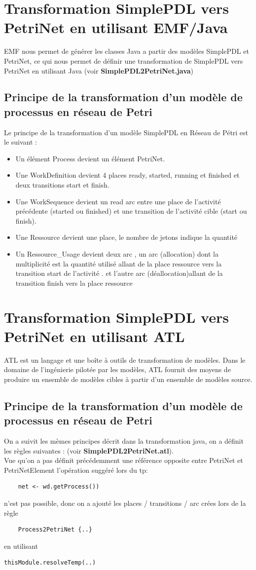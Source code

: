 \documentclass{article}
\begin{document}
\section{Transformation SimplePDL vers PetriNet en utilisant EMF/Java}
EMF nous permet de générer les classes Java a partir des modèles SimplePDL et PetriNet, ce qui nous permet de définir une transformation
de SimplePDL vers PetriNet en utilisant Java (voir \textbf{SimplePDL2PetriNet.java})
\subsection{Principe de la transformation d’un modèle de processus en réseau de Petri}
Le principe de la transformation d’un modèle SimplePDL en Réseau de Pétri est le suivant :
\begin{itemize}
    \item Un élément Process devient un élément PetriNet.
    \item Une WorkDefinition devient 4 places ready, started, running et finished et deux transitions start et finish.
    \item Une WorkSequence devient un read arc entre une place de l’activité précédente (started ou finished) et une transition de l’activité cible (start ou finish).
    \item Une Ressource devient une place, le nombre de jetons indique la quantité
    \item Un Ressource\_Usage devient deux arc , un arc (allocation) dont la multiplicité est la quantité utilisé allant de la place ressource vers la transition start de l'activité . et l'autre arc (déallocation)allant de la transition finish vers la place ressource
\end{itemize}

\section{Transformation SimplePDL vers PetriNet en utilisant ATL}
ATL est un langage et une boîte à outils de transformation de modèles. Dans le domaine de l'ingénierie pilotée par les modèles, 
ATL fournit des moyens de produire un ensemble de modèles cibles à partir d'un ensemble de modèles source.
\subsection{Principe de la transformation d’un modèle de processus en réseau de Petri}
On a suivit les mèmes principes décrit dans la transformation java, on a définit les règles suivantes : (voir \textbf{SimplePDL2PetriNet.atl}). \\
Vue qu'on a pas définit précédemment une référence opposite entre PetriNet et PetriNetElement l'opération suggéré lors du tp: 
\begin{verbatim}
    net <- wd.getProcess())
\end{verbatim}
n'est pas possible, donc on a ajouté les places / transitions / arc crées lors de la règle 
\begin{verbatim}
    Process2PetriNet {..}
\end{verbatim}
en utilisant 
\begin{verbatim}
thisModule.resolveTemp(..)
\end{verbatim}
\end{document}
